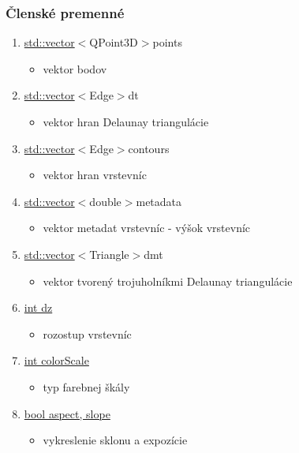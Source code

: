 \documentclass[12pt]{article}
\begin{document}
\subsubsection{Členské premenné}
\begin{enumerate}

\item[] \underline {std::vector}$<${QPoint3D}$>${points}
\begin{itemize}
\item vektor bodov 
\end{itemize}

\item[] \underline {std::vector}$<${Edge}$>${dt}
\begin{itemize}
\item vektor hran Delaunay triangulácie
\end{itemize}

\item[] \underline {std::vector}$<${Edge}$>${contours}
\begin{itemize}
\item vektor hran vrstevníc
\end{itemize}

\item[] \underline {std::vector}$<${double}$>${metadata}
\begin{itemize}
\item vektor metadat vrstevníc - výšok vrstevníc
\end{itemize}

\item[] \underline {std::vector}$<${Triangle}$>${dmt}
\begin{itemize}
\item vektor tvorený trojuholníkmi Delaunay triangulácie
\end{itemize}

\item[] \underline {int dz}
\begin{itemize}
\item rozostup vrstevníc
\end{itemize}

\item[] \underline {int colorScale}
\begin{itemize}
\item typ farebnej škály
\end{itemize}

\item[] \underline {bool aspect, slope}
\begin{itemize}
\item vykreslenie sklonu a expozície
\end{itemize}

\end{enumerate}
\end{document}
